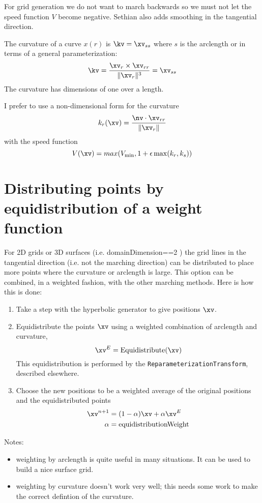 For grid generation we do not want to march backwards so we must not let the speed function $V$
become negative. Sethian also adds smoothing in the tangential direction.


The curvature of a curve $x(r)$ is $\kv=\xv_{ss}$ where $s$ is the arclength or in terms 
of a general parameterization:
\[
   \kv = { \xv_r \times \xv_{rr} \over \|\xv_r\|^3 } = \xv_{ss}
\]
The curvature has dimensions of one over a length.


I prefer to use a non-dimensional form for the curvature
\[
   k_r(\xv) = { \nv\cdot\xv_{rr} \over \|\xv_r\| } 
\]
with the speed function
\[
   V(\xv) = max( V_{\rm min} , 1 + \epsilon \max(k_r,k_s) )
\]

\section{Distributing points by equidistribution of a weight function}

For 2D grids or 3D surfaces (i.e. domainDimension==2 )
the grid lines in the tangential direction (i.e. not the marching direction)
can be distributed to place more 
points where the curvature or arclength is large. This option can be combined, in a
weighted fashion, with the other marching methods.
Here is how this is 
done:
\begin{enumerate}
  \item Take a step with the hyperbolic generator to give positions $\xv$.
  \item Equidistribute the points $\xv$ using a weighted combination of arclength
     and curvature,
\[
         \xv^E = {\rm Equidistribute} (\xv)
\]
  This equidistribution is performed by the {\tt ReparameterizationTransform}, described elsewhere.
  \item Choose the new positions to be a weighted average of the original positions
     and the equidistributed points
\begin{align*}
       \xv^{n+1} &= (1-\alpha) \xv + \alpha \xv^E  \\
       \alpha &= {\rm equidistributionWeight}
\end{align*}
\end{enumerate}
Notes: 
\begin{itemize}
  \item weighting by arclength is quite useful in many situations. It can be used to build
    a nice surface grid.
 \item weighting by curvature doesn't work very well; this needs some work to make the
correct defintion of the curvature.
\end{itemize}


